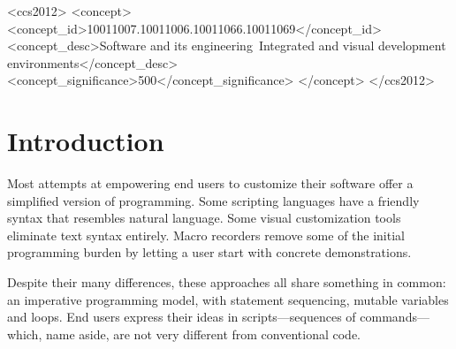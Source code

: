 \documentclass[sigplan,10pt,anonymous,review]{acmart}
\begin{document}
\begin{CCSXML}
<ccs2012>
<concept>
<concept_id>10011007.10011006.10011066.10011069</concept_id>
<concept_desc>Software and its engineering~Integrated and visual development environments</concept_desc>
<concept_significance>500</concept_significance>
</concept>
</ccs2012>
\end{CCSXML}




\maketitle

\hypertarget{introduction}{%
\section{Introduction}\label{introduction}}

Most attempts at empowering end users to customize their software offer
a simplified version of programming. Some scripting languages
\citep{bolin2005, cook2007} have a friendly syntax that resembles
natural language. Some visual customization tools eliminate text syntax
entirely. Macro recorders \citep{cook2007, chasins2018, anupam2000}
remove some of the initial programming burden by letting a user start
with concrete demonstrations.

Despite their many differences, these approaches all share something in
common: an imperative programming model, with statement sequencing,
mutable variables and loops. End users express their ideas in
scripts---sequences of commands---which, name aside, are not very
different from conventional code.
\end{document}
